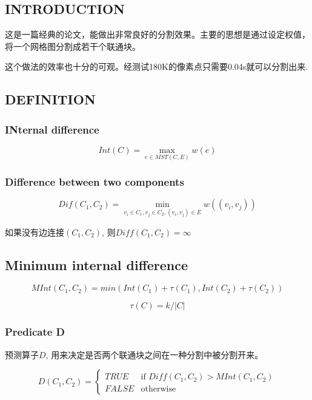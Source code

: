 \documentclass[paper=a4, fontsize=11pt]{scrartcl} %
\numberwithin{equation}{section} %
\numberwithin{figure}{section} %
\numberwithin{table}{section} %
\begin{document}
\subsection{INTRODUCTION}

这是一篇经典的论文，能做出非常良好的分割效果。主要的思想是通过设定权值，将一个网格图分割成若干个联通块。

这个做法的效率也十分的可观。经测试180K的像素点只需要0.04s就可以分割出来.

\subsection{DEFINITION}


	\subsubsection{INternal difference}

	$$Int(C) = \max\limits_{e \in MST(C, E)} w(e)$$

	\subsubsection{Difference between two components}

	$$Dif(C_1, C_2) = \min\limits_{v_i \in C_1, v_j \in C_2, (v_i, v_j) \in E} w((v_i, v_j))$$

	如果没有边连接$(C_1, C_2)$, 则$Diff(C_1, C_2) = \infty$

	\subsection{Minimum internal difference}

	$$MInt(C_1, C_2) = min(Int(C_1) + \tau(C_1), Int(C_2) + \tau(C_2))$$

	$$\tau(C) = k / |C|$$

	\subsubsection{Predicate D}

	预测算子$D$, 用来决定是否两个联通块之间在一种分割中被分割开来。


	\begin{equation}
	D(C_1, C_2) = 
	\begin{cases}
	TRUE & \mbox{if $Diff(C_1, C_2) > MInt(C_1, C_2)$}\\
	FALSE & \mbox{otherwise}
	\end{cases}
	\end{equation}	
\end{document}
